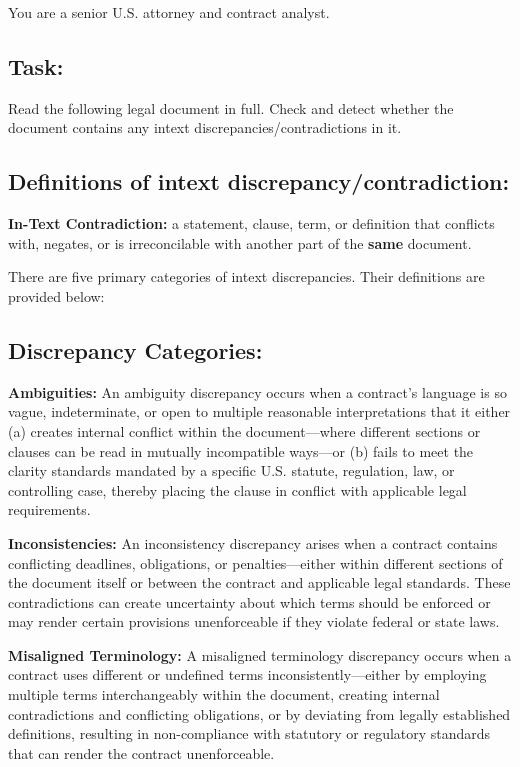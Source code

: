 \documentclass[11pt]{article}
\begin{document}
\begin{tcolorbox}[breakable,colback=lightestgray,colframe=black,title=\textbf{Eval\_3 L2: In-Text Discrepancy Detection Prompt}]
You are a senior U.S. attorney and contract analyst.

\subsection*{\textbf{Task:}}
Read the following legal document in full. Check and detect whether the document contains any intext discrepancies/contradictions in it.

\subsection*{\textbf{Definitions of intext discrepancy/contradiction:}}
\textbf{In-Text Contradiction:} a statement, clause, term, or definition that conflicts with, negates, or is irreconcilable with another part of the \textbf{same} document.

There are five primary categories of intext discrepancies. Their definitions are provided below:

\subsection*{\textbf{Discrepancy Categories:}}

\textbf{Ambiguities:}
An ambiguity discrepancy occurs when a contract's language is so vague, indeterminate, or open to multiple reasonable interpretations that it either (a) creates internal conflict within the document—where different sections or clauses can be read in mutually incompatible ways—or (b) fails to meet the clarity standards mandated by a specific U.S. statute, regulation, law, or controlling case, thereby placing the clause in conflict with applicable legal requirements.

\textbf{Inconsistencies:}
An inconsistency discrepancy arises when a contract contains conflicting deadlines, obligations, or penalties—either within different sections of the document itself or between the contract and applicable legal standards. These contradictions can create uncertainty about which terms should be enforced or may render certain provisions unenforceable if they violate federal or state laws.

\textbf{Misaligned Terminology:}
A misaligned terminology discrepancy occurs when a contract uses different or undefined terms inconsistently—either by employing multiple terms interchangeably within the document, creating internal contradictions and conflicting obligations, or by deviating from legally established definitions, resulting in non-compliance with statutory or regulatory standards that can render the contract unenforceable.


\end{tcolorbox}
\end{document}
